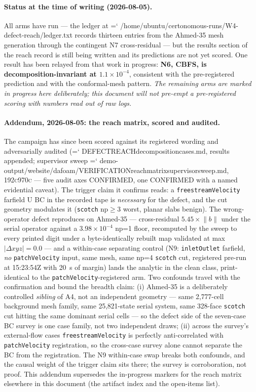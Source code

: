\documentclass[11pt,a4paper]{article}
\newcommand{\artifact}[1]{{\small\ttfamily\hyphenchar\font=`\-\relax
  \def\_{\textunderscore\allowbreak}#1}}
\newcommand{\commit}[1]{\textsc{\small #1}}
\begin{document}
\paragraph{Status at the time of writing (2026-08-05).} All arms have run --- the ledger at
\artifact{/home/ubuntu/certonomous-runs/W4-defect-reach/ledger.txt} records thirteen entries
from the Ahmed-35 mesh generation through the contingent N7 cross-residual --- but the
results section of the reach record is still being written and its predictions are not yet
scored. One result has been relayed from that work in progress: \textbf{N6, CBFS, is
decomposition-invariant at \(1.1\times10^{-4}\)}, consistent with the pre-registered
prediction and with the conformal-mesh pattern. \emph{The remaining arms are marked in
progress here deliberately; this document will not pre-empt a pre-registered scoring with
numbers read out of raw logs.}

\paragraph{Addendum, 2026-08-05: the reach matrix, scored and audited.} The campaign has
since been scored against its registered wording and adversarially audited
(\artifact{DEFECT\_REACH\_decomposition\_cases.md}, results appended; supervisor sweep
\artifact{demo-output/website/dafoam/VERIFICATION\_reach\_matrix\_supervisor\_sweep.md},
\commit{192c970c} --- five audit axes CONFIRMED, one CONFIRMED with a named evidential
caveat). The trigger claim it confirms reads: a \texttt{freestreamVelocity} farfield U BC in
the recorded tape is \emph{necessary} for the defect, and the cut geometry modulates it
(\texttt{scotch} np\(\ge\)3 worst, planar slabs benign). The wrong-operator defect reproduces
on Ahmed-35 --- cross-residual \(5.45\times\lVert b\rVert\) under the serial operator against
a \(3.98\times10^{-4}\) np=1 floor, recomputed by the sweep to every printed digit under a
byte-identically rebuilt map validated at max \(\lvert\Delta xyz\rvert = 0.0\) --- and a
within-case separating control (N9: \texttt{inletOutlet} farfield, \emph{no}
\texttt{patchVelocity} input, same mesh, same np=4 \texttt{scotch} cut, registered pre-run at
15:23:54Z with 20~s of margin) lands the analytic in the clean class, print-identical to the
\texttt{patchVelocity}-registered arm. Two confounds travel with the confirmation and bound
the breadth claim: (i) Ahmed-35 is a deliberately controlled \emph{sibling} of A4, not an
independent geometry --- same 2{,}777-cell background mesh family, same 25{,}821-state serial
system, same 328-face \texttt{scotch} cut hitting the same dominant serial cells --- so the
defect side of the seven-case BC survey is one case family, not two independent draws;
(ii) across the survey's external-flow cases \texttt{freestreamVelocity} is perfectly
anti-correlated with \texttt{patchVelocity} registration, so the cross-case survey alone
cannot separate the BC from the registration. The N9 within-case swap breaks both confounds,
and the causal weight of the trigger claim sits there; the survey is corroboration, not
proof. This addendum supersedes the in-progress markers for the reach matrix elsewhere in
this document (the artifact index and the open-items list).
\end{document}
